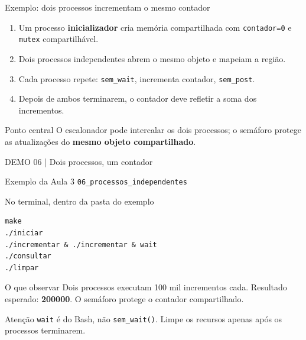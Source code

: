 \documentclass[aspectratio=169,11pt]{beamer}
\begin{document}
\begin{frame}{Exemplo: dois processos incrementam o mesmo contador}
\small
\begin{enumerate}
\item Um processo \textbf{inicializador} cria memória compartilhada com \texttt{contador=0} e \texttt{mutex} compartilhável.
\item Dois processos independentes abrem o mesmo objeto e mapeiam a região.
\item Cada processo repete: \texttt{sem\_wait}, incrementa contador, \texttt{sem\_post}.
\item Depois de ambos terminarem, o contador deve refletir a soma dos incrementos.
\end{enumerate}
\begin{alertblock}{Ponto central}
O escalonador pode intercalar os dois processos; o semáforo protege as atualizações do \textbf{mesmo objeto compartilhado}.
\end{alertblock}
\end{frame}


\begin{frame}[fragile]{DEMO 06 | Dois processos, um contador}
\footnotesize
\begin{block}{Exemplo da Aula 3}
\texttt{06\_processos\_independentes}
\end{block}
\begin{block}{No terminal, dentro da pasta do exemplo}
\begin{verbatim}
make
./iniciar
./incrementar & ./incrementar & wait
./consultar
./limpar
\end{verbatim}
\end{block}
\begin{exampleblock}{O que observar}
Dois processos executam 100 mil incrementos cada. Resultado esperado: \textbf{200000}. O semáforo protege o contador compartilhado.
\end{exampleblock}
\begin{alertblock}{Atenção}
\texttt{wait} é do Bash, não \texttt{sem\_wait()}. Limpe os recursos apenas após os processos terminarem.
\end{alertblock}
\end{frame}
\end{document}
